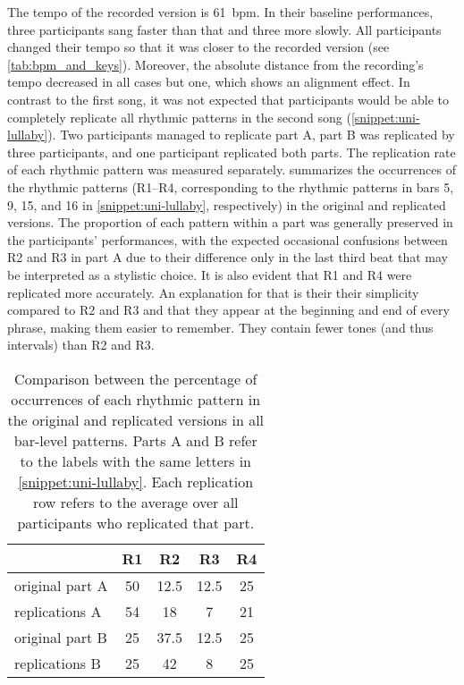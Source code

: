 %
The tempo of the recorded version is \SI{61}{\ac{bpm}}.
In their baseline performances, three participants sang faster than that and three more slowly.
All participants changed their tempo so that it was closer to the recorded version (see \cref{tab:bpm_and_keys}).
Moreover, the absolute distance from the recording's tempo decreased in all cases but one, which shows an alignment effect.
In contrast to the first song, it was not expected that participants would be able to completely replicate all rhythmic patterns in the second song (\cref{snippet:uni-lullaby}).
Two participants managed to replicate part A, part B was replicated by three participants, and one participant replicated both parts.
The replication rate of each rhythmic pattern was measured separately.
 summarizes the occurrences of the rhythmic patterns (R1--R4, corresponding to the rhythmic patterns in bars 5, 9, 15, and 16 in \cref{snippet:uni-lullaby}, respectively) in the original and replicated versions.
The proportion of each pattern within a part was generally preserved in the participants' performances, with the expected occasional confusions between R2 and R3 in part A due to their difference only in the last third beat that may be interpreted as a stylistic choice.
It is also evident that R1 and R4 were replicated more accurately.
An explanation for that is their their simplicity compared to R2 and R3 and that they appear at the beginning and end of every phrase, making them easier to remember.
They contain fewer tones (and thus intervals) than R2 and R3.
%
\begin{table}
	\caption[Percentages of rhythmic pattern replications]
		{Comparison between the percentage of occurrences of each rhythmic pattern in the original and replicated versions in all bar-level patterns.
		Parts A and B refer to the labels with the same letters in \cref{snippet:uni-lullaby}.
		Each replication row refers to the average over all participants who replicated that part.}
	\label{tab:neutral_rhythm_key}  
	\centering
	\begin{tabularx}{\linewidth}{XSSSS}
		\toprule
						& \bfseries{R1}		& \bfseries{R2}		& \bfseries{R3}		& \bfseries{R4}\\
		\midrule
		original part A	& 50				& 12.5				& 12.5				& 25\\
		replications A	& 54				& 18				& 7					& 21\\
		\rule{0pt}{0.5cm}%
		original part B	& 25				& 37.5				& 12.5				& 25\\
		replications B	& 25				& 42				& 8					& 25\\		
		\bottomrule
	\end{tabularx}
\end{table}
%



